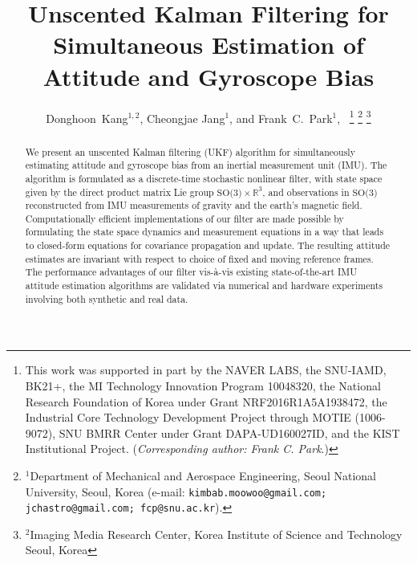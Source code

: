 \documentclass[a4paper, 10pt, conference]{ieeeconf}      %
\title{\LARGE \bf
Unscented Kalman Filtering for Simultaneous Estimation of
Attitude and Gyroscope Bias
}
\author{Donghoon~Kang$^{1, 2}$, \IEEEmembership{Member,~IEEE,} Cheongjae Jang$^{1}$,
 and Frank~C.~Park$^{1}$,~\IEEEmembership{Fellow,~IEEE}%
\thanks{This work was supported in part by the NAVER LABS,
the SNU-IAMD, BK21+, the MI Technology Innovation Program 10048320,
the National Research Foundation of Korea under Grant
NRF2016R1A5A1938472, the Industrial Core Technology Development
Project through MOTIE (1006-9072), SNU BMRR
Center under Grant DAPA-UD160027ID, and the KIST Institutional
Project. (\emph{Corresponding author: Frank C. Park}.)}%
\thanks{$^{1}$Department of Mechanical and Aerospace Engineering,
        Seoul National University, Seoul, Korea
        (e-mail:
        {\tt\small kimbab.moowoo@gmail.com; jchastro@gmail.com; fcp@snu.ac.kr}).}%
\thanks{$^{2}$Imaging Media Research Center, Korea Institute of Science and Technology
        Seoul, Korea
        }%
}
\begin{document}
\maketitle
\thispagestyle{empty}
\pagestyle{empty}


\begin{abstract}
We present an unscented Kalman filtering (UKF) algorithm for simultaneously
estimating attitude and gyroscope bias from an inertial measurement unit
(IMU).  The algorithm is formulated as a discrete-time stochastic nonlinear
filter, with state space given by the direct product matrix Lie group
$\mbox{SO(3)} \times \mathbb{R}^3$, and observations in $\mbox{SO(3)}$
reconstructed from IMU measurements of gravity and the earth's magnetic
field.  Computationally efficient implementations of our filter are made
possible by formulating the state space dynamics and measurement equations
in a way that leads to closed-form equations for covariance propagation
and update.  The resulting attitude estimates are invariant with respect
to choice of fixed and moving reference frames.  The performance advantages
of our filter vis-\`{a}-vis existing state-of-the-art IMU attitude
estimation algorithms are validated via numerical and hardware experiments
involving both synthetic and real data.
\end{abstract}
\end{document}
